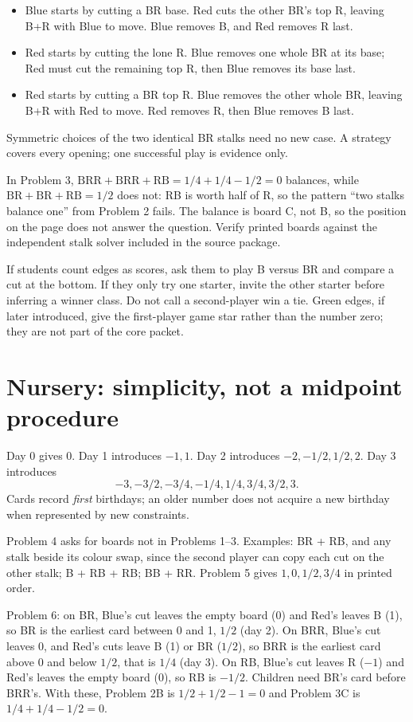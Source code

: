 \documentclass[11pt,letterpaper]{article}
\begin{document}
\begin{itemize}
\item Blue starts by cutting a BR base. Red cuts the other BR's top R, leaving B+R with Blue to move. Blue removes B, and Red removes R last.
\item Red starts by cutting the lone R. Blue removes one whole BR at its base; Red must cut the remaining top R, then Blue removes its base last.
\item Red starts by cutting a BR top R. Blue removes the other whole BR, leaving B+R with Red to move. Red removes R, then Blue removes B last.
\end{itemize}
Symmetric choices of the two identical BR stalks need no new case. A strategy covers every opening; one successful play is evidence only.

In Problem 3, $\mathrm{BRR}+\mathrm{BRR}+\mathrm{RB}=1/4+1/4-1/2=0$ balances, while $\mathrm{BR}+\mathrm{BR}+\mathrm{RB}=1/2$ does not: RB is worth half of R, so the pattern ``two stalks balance one'' from Problem 2 fails. The balance is board C, not B, so the position on the page does not answer the question. Verify printed boards against the independent stalk solver included in the source package.

If students count edges as scores, ask them to play B versus BR and compare a cut at the bottom. If they only try one starter, invite the other starter before inferring a winner class. Do not call a second-player win a tie. Green edges, if later introduced, give the first-player game star rather than the number zero; they are not part of the core packet.
\newpage
\section*{Nursery: simplicity, not a midpoint procedure}
Day 0 gives 0. Day 1 introduces $-1,1$. Day 2 introduces $-2,-1/2,1/2,2$. Day 3 introduces\[ -3,-3/2,-3/4,-1/4,1/4,3/4,3/2,3. \] Cards record \emph{first} birthdays; an older number does not acquire a new birthday when represented by new constraints.

Problem 4 asks for boards not in Problems 1--3. Examples: BR + RB, and any stalk beside its colour swap, since the second player can copy each cut on the other stalk; B + RB + RB; BB + RR. Problem 5 gives $1,0,1/2,3/4$ in printed order.

Problem 6: on BR, Blue's cut leaves the empty board (0) and Red's leaves B (1), so BR is the earliest card between 0 and 1, $1/2$ (day 2). On BRR, Blue's cut leaves 0, and Red's cuts leave B (1) or BR ($1/2$), so BRR is the earliest card above 0 and below $1/2$, that is $1/4$ (day 3). On RB, Blue's cut leaves R ($-1$) and Red's leaves the empty board (0), so RB is $-1/2$. Children need BR's card before BRR's. With these, Problem 2B is $1/2+1/2-1=0$ and Problem 3C is $1/4+1/4-1/2=0$.
\end{document}
